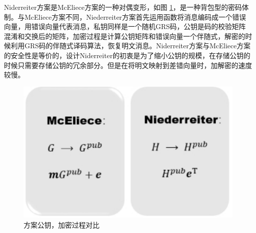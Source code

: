 Niderreiter方案\cite{Niederreiter1986Knapsack}是McEliece方案的一种对偶变形，如图 \ref{fig:comparator_pdf}，是一种背包型的密码体制。与McEliece方案不同，Niederreiter方案首先运用函数将消息编码成一个错误向量，用错误向量代表消息，私钥同样是一个随机GRS码，公钥是码的校验矩阵混淆和交换后的矩阵，加密过程是计算公钥矩阵和错误向量一个伴随式，解密的时候利用GRS码的伴随式译码算法，恢复明文消息。Niderreiter方案与McEliece方案的安全性是等价的\cite{Yuan1994On}，设计Niderreiter的初衷是为了缩小公钥的规模，在存储公钥的时候只需要存储公钥的冗余部分。但是在将明文映射到差错向量时，加解密的速度较慢。

\begin{figure}[H]
	\centering
	\includegraphics{fig/comparator.pdf}
	\caption{方案公钥，加密过程对比} %
	\label{fig:comparator_pdf}
\end{figure}

